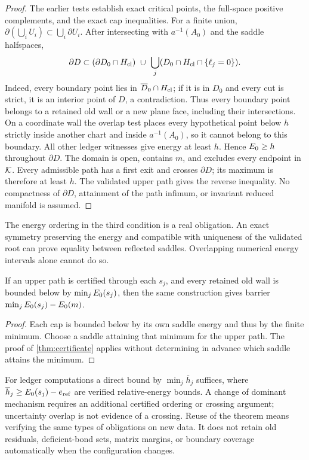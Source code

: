 \begin{proof}
The earlier tests establish exact critical points, the full-space
positive complements, and the exact cap inequalities. For a finite
union, $\partial(\bigcup_i U_i)\subset\bigcup_i\partial U_i$.
After intersecting with $a^{-1}(A_0)$ and the saddle halfspaces,
\[
 \partial D\subset
 (\partial D_0\cap H_{\rm cl})\ \cup\
 \bigcup_j(D_0\cap H_{\rm cl}\cap\{\ell_j=0\}).
\]
Indeed, every boundary point lies in $\overline D_0\cap H_{\rm cl}$;
if it is in $D_0$ and every cut is strict, it is an interior point of
$D$, a contradiction. Thus every boundary point belongs to a retained
old wall or a new plane face, including their intersections. On a coordinate wall the overlap test
places every hypothetical point below $h$ strictly inside another
chart and inside $a^{-1}(A_0)$, so it cannot belong to this boundary. All other ledger witnesses
give energy at least $h$. Hence $E_0\ge h$ throughout $\partial D$.
The domain is open, contains $m$, and excludes every endpoint in $\mathcal K$.
Every admissible path has a first exit and crosses $\partial D$;
its maximum is therefore at least $h$. The validated upper path gives
the reverse inequality. No compactness of $\partial D$, attainment of
the path infimum, or invariant reduced manifold is assumed.
\end{proof}

The energy ordering in the third condition is a real obligation.
An exact symmetry preserving the energy and compatible with uniqueness
of the validated root can prove equality between reflected saddles.
Overlapping numerical energy intervals alone cannot do so.

\begin{corollary}\label{cor:cert-competing}
If an upper path is certified through each $s_j$, and every retained
old wall is bounded below by $\min_jE_0(s_j)$, then the same construction
gives barrier $\min_jE_0(s_j)-E_0(m)$.
\end{corollary}
\begin{proof}
Each cap is bounded below by its own saddle energy and thus by the
finite minimum. Choose a saddle attaining that minimum for the upper
path. The proof of \cref{thm:certificate} applies without determining in advance
which saddle attains the minimum.
\end{proof}

For ledger computations a direct bound by $\min_j\overline h_j$ suffices, where
$\overline h_j\ge E_0(s_j)-e_{\rm ref}$ are verified relative-energy bounds. A change of
dominant mechanism requires an additional certified ordering or crossing
argument; uncertainty overlap is not evidence of a crossing. Reuse of
the theorem means verifying the same types of obligations on new data.
It does not retain old residuals, deficient-bond sets, matrix margins,
or boundary coverage automatically when the configuration changes.
